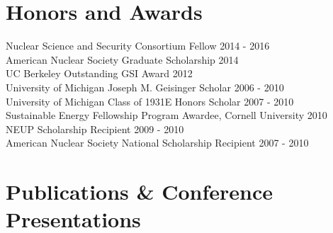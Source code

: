 \documentclass[margin,line]{res}
\begin{document}
\begin{resume}
\section{\sc Honors and Awards} 

Nuclear Science and Security Consortium Fellow \hfill 2014 - 2016 \\
American Nuclear Society Graduate Scholarship \hfill 2014 \\
UC Berkeley Outstanding GSI Award \hfill 2012 \\
University of Michigan Joseph M. Geisinger Scholar \hfill 2006 - 2010 \\
University of Michigan Class of 1931E Honors Scholar \hfill 2007 - 2010 \\
Sustainable Energy Fellowship Program Awardee, Cornell University \hfill 2010 \\
NEUP Scholarship Recipient \hfill 2009 - 2010 \\
American Nuclear Society National Scholarship Recipient \hfill 2007 - 2010 \\

\section{\sc Publications \& Conference Presentations}

\nocite{*}

\renewcommand{\section}[2]{}



\end{resume}
\end{document}
